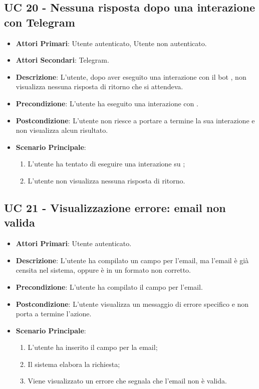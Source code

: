 
		\subsection{UC 20 - Nessuna risposta dopo una interazione con Telegram}
		\begin{itemize}
			\item \textbf{Attori Primari}: Utente autenticato, Utente non autenticato.
			\item \textbf{Attori Secondari}: Telegram.
			\item \textbf{Descrizione}: L'utente, dopo aver eseguito una interazione con il bot , non visualizza nessuna risposta di ritorno che si attendeva.
			\item \textbf{Precondizione}: L'utente ha eseguito una interazione con .
			\item \textbf{Postcondizione}: L'utente non riesce a portare a termine la sua interazione e non visualizza alcun risultato.
			\item \textbf{Scenario Principale}:
			\begin{enumerate}
				\item L'utente ha tentato di eseguire una interazione su ;
				\item L'utente non visualizza nessuna risposta di ritorno.
			\end{enumerate}
		\end{itemize}



		\subsection{UC 21 - Visualizzazione errore: email non valida}
		\begin{itemize}
			\item \textbf{Attori Primari}: Utente autenticato.
			\item \textbf{Descrizione}: L'utente ha compilato un campo per l'email, ma l'email è già censita nel sistema, oppure è in un formato non corretto.
			\item \textbf{Precondizione}: L'utente ha compilato il campo per l'email.
			\item \textbf{Postcondizione}: L'utente visualizza un messaggio di errore specifico e non porta a termine l'azione.
			\item \textbf{Scenario Principale}:
			\begin{enumerate}
				\item L'utente ha inserito il campo per la email;
				\item Il sistema elabora la richiesta;
				\item Viene visualizzato un errore che segnala che l'email non è valida.
			\end{enumerate}
		\end{itemize}

